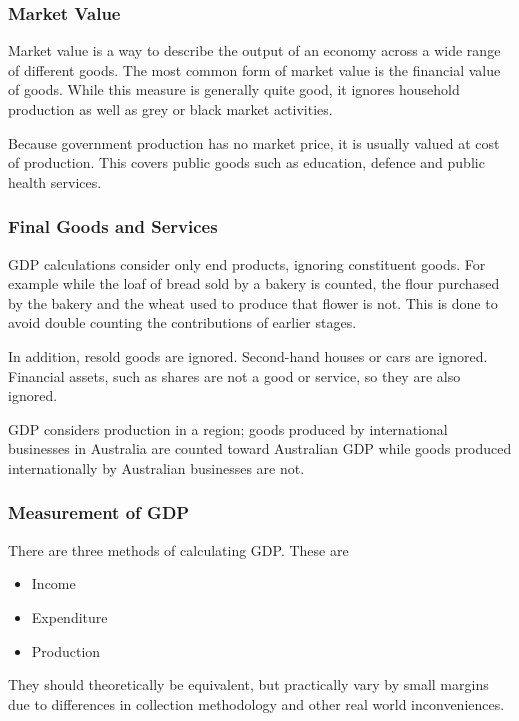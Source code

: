 \documentclass[12pt]{report}
\begin{document}
\begin{flushleft}
\subsubsection*{Market Value}
Market value is a way to describe the output of an economy across a wide range
of different goods. The most common form of market value is the financial value
of goods. While this measure is generally quite good, it ignores household 
production as well as grey or black market activities. \par
Because government production has no market price, it is usually valued at
cost of production. This covers public goods such as education, defence and 
public health services.

\subsubsection*{Final Goods and Services}
GDP calculations consider only end products, ignoring constituent goods. For 
example while the loaf of bread sold by a bakery is counted, the flour 
purchased by the bakery and the wheat used to produce that flower is not. This
is done to avoid double counting the contributions of earlier stages. \par
In addition, resold goods are ignored. Second-hand houses or cars are ignored.
Financial assets, such as shares are not a good or service, so they are also
ignored.

\bigskip
GDP considers production in a region; goods produced by international 
businesses in Australia are counted toward Australian GDP while goods produced
internationally by Australian businesses are not.

\subsubsection*{Measurement of GDP}
There are three methods of calculating GDP. These are
\begin{itemize}
    \item Income
    \item Expenditure
    \item Production
\end{itemize}
They should theoretically be equivalent, but practically vary by small margins
due to differences in collection methodology and other real world 
inconveniences.


\end{flushleft}
\end{document}
